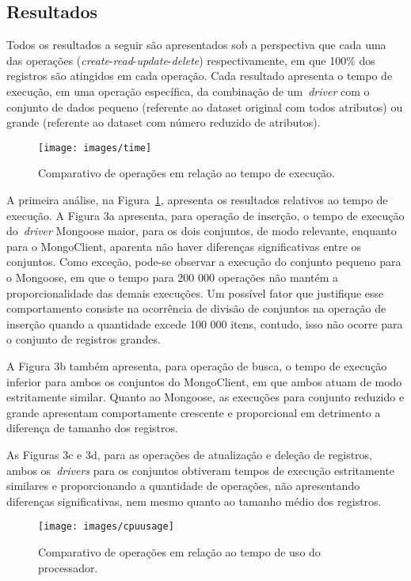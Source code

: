 \documentclass[12pt]{article}
\begin{document}
\subsection{Resultados}
\label{section:resultados}

Todos os resultados a seguir são apresentados sob a perspectiva que cada uma das operações (\emph{create}-\emph{read}-\emph{update}-\emph{delete}) respectivamente, em que 100\% dos registros são atingidos em cada operação. 
Cada resultado apresenta o tempo de execução, em uma operação específica, da combinação de um~\emph{driver} com o conjunto de dados pequeno (referente ao dataset original com todos atributos) ou grande (referente ao dataset com número reduzido de atributos).

\begin{figure}[ht]
\centering
\texttt{[image: images/time]}
\caption{Comparativo de operações em relação ao tempo de execução.}
\label{fig:time}
\end{figure}

A primeira análise, na Figura~\ref{fig:time}, apresenta os resultados relativos ao tempo de execução. 
A Figura 3a apresenta, para operação de inserção, o tempo de execução do~\emph{driver} Mongoose maior, para os dois conjuntos, de modo relevante, enquanto para o MongoClient, aparenta não haver diferenças significativas entre os conjuntos. 
Como exceção, pode-se observar a execução do conjunto pequeno para o Mongoose, em que o tempo para 200 000 operações não mantém a proporcionalidade das demais execuções. Um possível fator que justifique esse comportamento consiste na ocorrência de divisão de conjuntos na operação de inserção quando a quantidade excede 100 000 itens, contudo, isso não ocorre para o conjunto de registros grandes.

A Figura 3b também apresenta, para operação de busca, o tempo de execução inferior para ambos os conjuntos do MongoClient, em que ambos atuam de modo estritamente similar. 
Quanto ao Mongoose, as execuções para conjunto reduzido e grande apresentam comportamente crescente e proporcional em detrimento a diferença de tamanho dos registros. 

As Figuras 3c e 3d, para as operações de atualização e deleção de registros, ambos os~\emph{drivers} para os conjuntos obtiveram tempos de execução estritamente similares e proporcionando a quantidade de operações, não apresentando diferenças significativas, nem mesmo quanto ao tamanho médio dos registros.

\begin{figure}[ht]
    \centering
    \texttt{[image: images/cpuusage]}
    \caption{Comparativo de operações em relação ao tempo de uso do processador.}
    \label{fig:cpuusage}
\end{figure}
\end{document}
